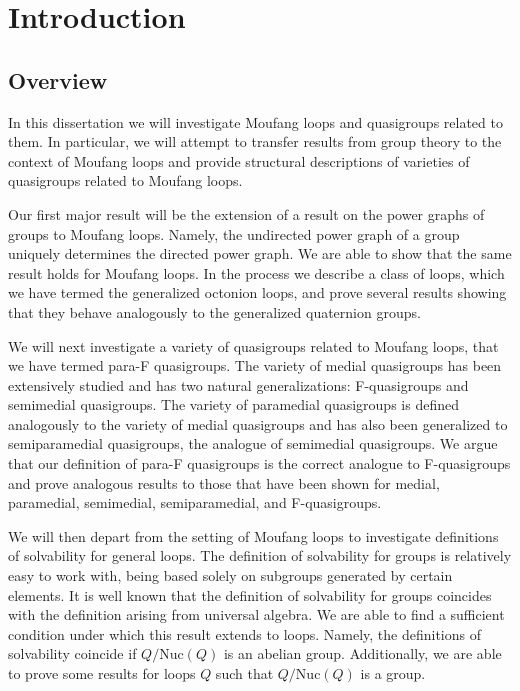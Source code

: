 \documentclass[12pt, twoside, openright]{report}
\theoremstyle{definition}
\newcommand{\nuc}{\text{Nuc}}       %
\begin{document}
\newpage %


\chapter{Introduction}

\section{Overview}

In this dissertation we will investigate Moufang loops and quasigroups related to them. In particular, we will attempt
  to transfer results from group theory to the context of Moufang loops and provide structural descriptions of
  varieties of quasigroups related to Moufang loops.

Our first major result will be the extension of a result on the power graphs of groups to Moufang loops. Namely, the
  undirected power graph of a group uniquely determines the directed power graph. We are able to show that the same
  result holds for Moufang loops. In the process we describe a class of loops, which we have termed the generalized
  octonion loops, and prove several results showing that they behave analogously to the generalized quaternion groups.

We will next investigate a variety of quasigroups related to Moufang loops, that we have termed para-F quasigroups. The
  variety of medial quasigroups has been extensively studied and has two natural generalizations: F-quasigroups and
  semimedial quasigroups. The variety of paramedial quasigroups is defined analogously to the variety of medial
  quasigroups and has also been generalized to semiparamedial quasigroups, the analogue of semimedial quasigroups. We
  argue that our definition of para-F quasigroups is the correct analogue to F-quasigroups and prove analogous results
  to those that have been shown for medial, paramedial, semimedial, semiparamedial, and F-quasigroups.

We will then depart from the setting of Moufang loops to investigate definitions of solvability for general loops. The
  definition of solvability for groups is relatively easy to work with, being based solely on subgroups generated by
  certain elements. It is well known that the definition of solvability for groups coincides with the definition arising
  from universal algebra. We are able to find a sufficient condition under which this result extends to loops. Namely,
  the definitions of solvability coincide if $Q/\nuc(Q)$ is an abelian group. Additionally, we are able to prove some
  results for loops $Q$ such that $Q/\nuc(Q)$ is a group.
\end{document}
